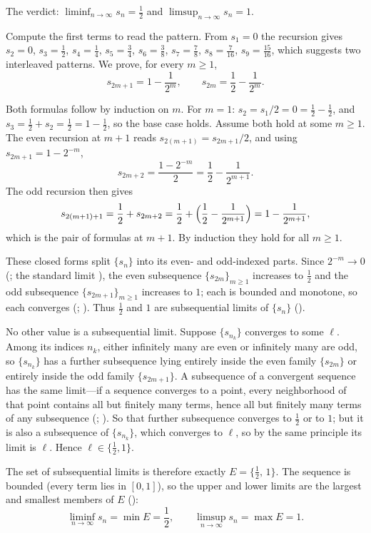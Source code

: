 \documentclass[main.tex]{subfiles}
\begin{document}
\begin{Solution}
The verdict: $\displaystyle\liminf_{n\to\infty}s_n=\tfrac12$ and $\displaystyle\limsup_{n\to\infty}s_n=1$.

Compute the first terms to read the pattern. From $s_1=0$ the recursion gives $s_2=0$,
$s_3=\tfrac12$, $s_4=\tfrac14$, $s_5=\tfrac34$, $s_6=\tfrac38$, $s_7=\tfrac78$, $s_8=\tfrac7{16}$,
$s_9=\tfrac{15}{16}$, which suggests two interleaved patterns. We prove, for every $m\ge 1$,
\[
s_{2m+1}=1-\frac{1}{2^{m}},\qquad s_{2m}=\frac12-\frac{1}{2^{m}}.
\]

Both formulas follow by induction on $m$. For $m=1$: $s_2=s_1/2=0=\tfrac12-\tfrac12$, and
$s_3=\tfrac12+s_2=\tfrac12=1-\tfrac12$, so the base case holds. Assume both hold at some $m\ge 1$.
The even recursion at $m+1$ reads $s_{2(m+1)}=s_{2m+1}/2$, and using $s_{2m+1}=1-2^{-m}$,
\[
s_{2m+2}=\frac{1-2^{-m}}{2}=\frac12-\frac{1}{2^{m+1}}.
\]
The odd recursion then gives
\[
s_{2(m+1)+1}=\frac12+s_{2m+2}=\frac12+\Bigl(\frac12-\frac{1}{2^{m+1}}\Bigr)=1-\frac{1}{2^{m+1}},
\]
which is the pair of formulas at $m+1$. By induction they hold for all $m\ge 1$.

These closed forms split $\{s_n\}$ into its even- and odd-indexed parts. Since $2^{-m}\to 0$
(; the standard limit ), the even
subsequence $\{s_{2m}\}_{m\ge1}$ increases to $\tfrac12$ and the odd subsequence
$\{s_{2m+1}\}_{m\ge1}$ increases to $1$; each is bounded and monotone, so each converges
(; ). Thus $\tfrac12$ and $1$ are
subsequential limits of $\{s_n\}$ ().

No other value is a subsequential limit. Suppose $\{s_{n_k}\}$ converges to some $\ell$. Among its
indices $n_k$, either infinitely many are even or infinitely many are odd, so $\{s_{n_k}\}$ has a
further subsequence lying entirely inside the even family $\{s_{2m}\}$ or entirely inside the odd
family $\{s_{2m+1}\}$. A subsequence of a convergent sequence has the same limit---if a sequence
converges to a point, every neighborhood of that point contains all but finitely many terms, hence
all but finitely many terms of any subsequence (; ).
So that further subsequence converges to $\tfrac12$ or to $1$; but it is also a subsequence of
$\{s_{n_k}\}$, which converges to $\ell$, so by the same principle its limit is $\ell$. Hence
$\ell\in\{\tfrac12,1\}$.

The set of subsequential limits is therefore exactly $E=\{\tfrac12,\,1\}$. The sequence is bounded
(every term lies in $[0,1]$), so the upper and lower limits are the largest and smallest members of
$E$ ():
\[
\liminf_{n\to\infty}s_n=\min E=\frac12,\qquad \limsup_{n\to\infty}s_n=\max E=1.
\]
\end{Solution}
\end{document}
